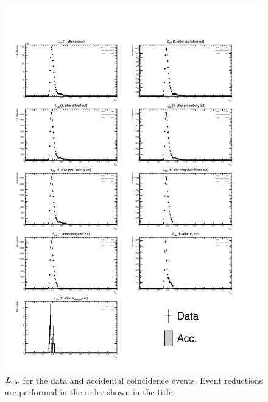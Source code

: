 \begin{figure}[h]
	\centering
	\includegraphics[width=15cm]{PDF/Dist_Data/Che_50deg_tag_ge1/pilike}
	\caption[$L_{\rm cle}$ for the data and accidental coincidence events]{
	$L_{\rm cle}$ for the data and accidental coincidence events.
	Event reductions are performed in the order shown in the title.
	}\label{Data_pilike}
\end{figure}

